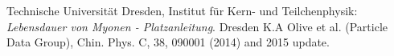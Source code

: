 \begin{thebibliography}{99}
 Technische Universität Dresden,  Institut für Kern- und Teilchenphysik: \textit{Lebensdauer von Myonen - Platzanleitung}. Dresden
 K.A Olive et al. (Particle Data Group), Chin. Phys. C, 38, 090001 (2014) and 2015 update.
\end{thebibliography}

